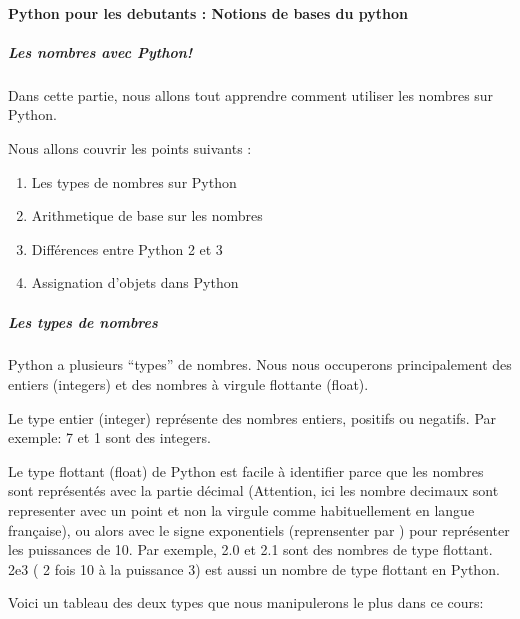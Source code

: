 \documentclass[letterpaper,11pt,english]{sphinxmanual}
\begin{document}
\paragraph{Python pour les debutants : Notions de bases du python}
\label{\detokenize{chapter2:python-pour-les-debutants-notions-de-bases-du-python}}

\subparagraph{Les nombres avec Python!}
\label{\detokenize{chapter2:les-nombres-avec-python}}
\sphinxAtStartPar
Dans cette partie, nous allons tout apprendre comment utiliser les
nombres sur Python.

\sphinxAtStartPar
Nous allons couvrir les points suivants :
\begin{enumerate}
%
\item {} 
\sphinxAtStartPar
Les types de nombres sur Python

\item {} 
\sphinxAtStartPar
Arithmetique de base sur les nombres

\item {} 
\sphinxAtStartPar
Différences entre Python 2 et 3

\item {} 
\sphinxAtStartPar
Assignation d’objets dans Python

\end{enumerate}


\subparagraph{Les types de nombres}
\label{\detokenize{chapter2:les-types-de-nombres}}
\sphinxAtStartPar
Python a plusieurs “types” de nombres. Nous nous occuperons
principalement des entiers (integers) et des nombres à virgule flottante
(float).

\sphinxAtStartPar
Le type entier (integer) représente des nombres entiers, positifs ou
negatifs. Par exemple: 7 et \sphinxhyphen{}1 sont des integers.

\sphinxAtStartPar
Le type flottant (float) de Python est facile à identifier parce que les
nombres sont représentés avec la partie décimal (Attention, ici les
nombre decimaux sont representer avec un point et non la virgule comme
habituellement en langue française), ou alors avec le signe exponentiels
(reprensenter par ) pour représenter les puissances de 10. Par
exemple, 2.0 et \sphinxhyphen{}2.1 sont des nombres de type flottant. 2e3 ( 2 fois 10
à la puissance 3) est aussi un nombre de type flottant en Python.

\sphinxAtStartPar
Voici un tableau des deux types que nous manipulerons le plus dans ce
cours:
\end{document}
